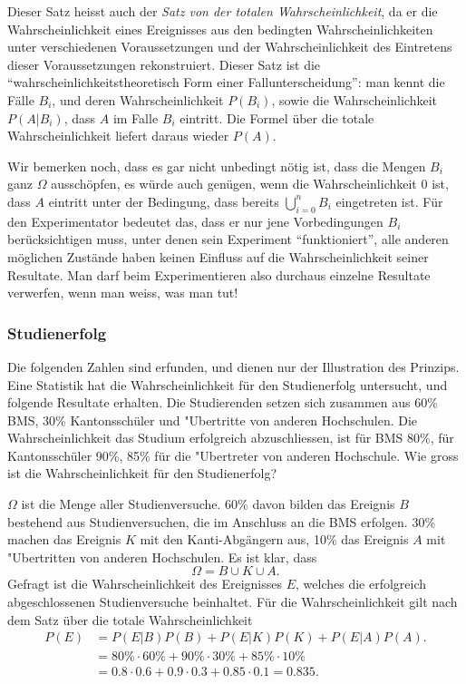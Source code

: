 Dieser Satz heisst auch der {\em Satz von der totalen Wahrscheinlichkeit},
da er die Wahrscheinlichkeit eines Ereignisses aus den bedingten
Wahrscheinlichkeiten unter verschiedenen Voraussetzungen und der
Wahrscheinlichkeit des Eintretens dieser Voraussetzungen rekonstruiert.
Dieser Satz ist die ``wahrscheinlichkeitstheoretisch Form einer
Fallunterscheidung'': man kennt die Fälle $B_i$, und deren Wahrscheinlichkeit
$P(B_i)$, sowie die Wahrscheinlichkeit $P(A|B_i)$, dass $A$ im Falle 
$B_i$ eintritt.
Die Formel über die totale Wahrscheinlichkeit
liefert daraus wieder $P(A)$.

Wir bemerken noch, dass es gar nicht unbedingt nötig ist, dass die Mengen
$B_i$ ganz $\Omega$ ausschöpfen, es würde auch
genügen, wenn die Wahrscheinlichkeit $0$ ist, dass $A$ eintritt
unter der Bedingung,
dass bereits $\bigcup_{i=0}^{n}B_i$ eingetreten ist.
Für den
Experimentator bedeutet das, dass er nur jene Vorbedingungen $B_i$
berücksichtigen muss, unter denen sein Experiment ``funktioniert'',
alle anderen möglichen Zustände haben keinen Einfluss auf
die Wahrscheinlichkeit seiner Resultate.
Man darf beim Experimentieren also durchaus einzelne Resultate
verwerfen, wenn man weiss, was man tut!

\subsubsection{Studienerfolg}
Die folgenden Zahlen sind erfunden, und dienen nur der Illustration
des Prinzips.
Eine Statistik hat die Wahrscheinlichkeit für den
Studienerfolg untersucht, und folgende Resultate erhalten.
Die Studierenden setzen sich zusammen aus 60\% BMS, 30\% Kantonsschüler
und "Ubertritte von anderen Hochschulen.
Die Wahrscheinlichkeit
das Studium erfolgreich abzuschliessen, ist für BMS 80\%,
für Kantonsschüler 90\%, 85\% für die "Ubertreter von anderen
Hochschule.
Wie gross ist die Wahrscheinlichkeit für den Studienerfolg?

$\Omega$ ist die Menge aller Studienversuche.
60\% davon bilden das
Ereignis $B$ bestehend aus Studienversuchen, die im Anschluss an die BMS
erfolgen.
30\% machen das Ereignis $K$ mit den Kanti-Abgängern aus,
10\% das Ereignis $A$ mit "Ubertritten von anderen Hochschulen.
Es ist klar, dass 
\[
\Omega = B \cup K\cup A.
\]
Gefragt ist die Wahrscheinlichkeit des Ereignisses $E$, welches
die erfolgreich abgeschlossenen Studienversuche beinhaltet.
Für die Wahrscheinlichkeit gilt nach dem Satz über die totale
Wahrscheinlichkeit
\begin{align*}
P(E)&=P(E|B)P(B)+P(E|K)P(K)+P(E|A)P(A).
\\
    &= 80\%\cdot 60\%
     + 90\%\cdot 30\%
     + 85\%\cdot 10\%
\\
&=0.8\cdot 0.6 + 0.9 \cdot 0.3 + 0.85 \cdot 0.1 = 0.835.
\end{align*}

